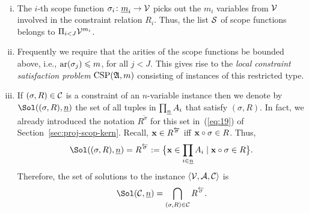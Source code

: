 \begin{remark}\
  \begin{enumerate}[(i)]
  \item The $i$-th scope function $\sigma_i \colon \underline{m}_i \to \mathcal{V}$ picks out the $m_i$
    variables from $\mathcal{V}$ involved in the constraint relation $R_i$. Thus, the
    list $\mathcal{S}$ of scope functions belongs to $\Pi_{i< J}\mathcal{V}^{m_i}$.
  \item
    Frequently we require that the arities of the scope functions be bounded
    above, i.e., $\operatorname{ar}(\sigma_j) \leqslant m$, for all $j<J$. This gives rise to the
    \emph{local constraint satisfaction problem} $\operatorname{CSP}(\mathfrak A,m)$ consisting
    of instances of this restricted type.  
  \item
    If $(\sigma, R) \in \mathcal{C}$ is a constraint of an $n$-variable instance
    then we denote by $\Sol((\sigma, R), \nn)$ the set of all tuples in $\prod_{\underline{n}}A_i$
    that satisfy $(\sigma, R)$. 
    In fact, we already introduced the notation $R^{\overleftarrow{\sigma}}$ for this set
    in~(\ref{eq:19}) of Section~\ref{sec:proj-scop-kern}.  Recall, 
    $\mathbf{x} \in R^{\overleftarrow{\sigma}}$ iff $\mathbf{x} \circ \sigma \in R$. Thus, 
    \[
    \Sol((\sigma, R), \nn) = R^{\overleftarrow{\sigma}}
    := \bigl\{\bx \in \prod_{i\in \nn}A_i %
    \mid \bx \circ \sigma \in R\bigr\}.
    \]
    Therefore, the set of solutions to the instance  $\langle\mathcal{V}, \mathcal{A}, \mathcal{C}\rangle$ is
    \[\Sol(\sC, \nn) = \bigcap_{(\sigma, R) \in \sC} R^{\overleftarrow{\sigma}}.\]



\end{enumerate}
\end{remark}
